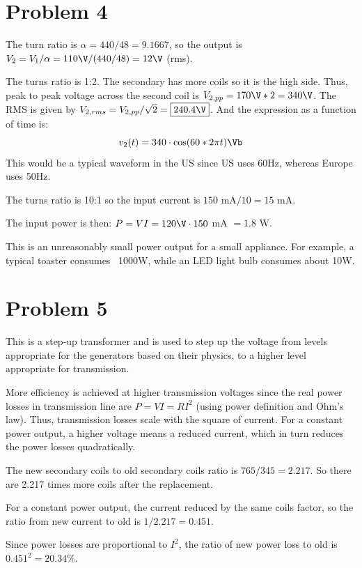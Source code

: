 \documentclass{homework}
\begin{document}
\section{Problem 4}
\begin{letterenum}
    \item The turn ratio is $\alpha = 440 / 48 = 9.1667$, so the output is
        $V_2 = V_1 / \alpha = 110 \V / (440 / 48) = 12 \V$ (rms).
    \item The turns ratio is 1:2. The secondary has more coils so it is
    the high side. Thus, peak to peak voltage across the 
    second coil is $V_{2,pp} = 170 \V * 2 = 340 \V$. The RMS is given by
    $V_{2,rms} = V_{2,pp}/\sqrt{2} = \boxed{240.4 \V}$. And the expression
    as a function of time is:
    \begin{equation*}
        v_2(t) = 340 \cdot \cos(60 * 2\pi t)  \Vb
    \end{equation*}
    This would be a typical waveform in the US since US uses 60Hz, whereas
    Europe uses 50Hz.

    \item The turns ratio is 10:1 so the input current is $150$ mA$/10 = 15$ mA.

    The input power is then: $P = VI = 120 \V \cdot 150$ mA $= 1.8$ W.

    This is an unreasonably small power output for a small appliance. For
    example, a typical toaster consumes ~1000W, while an LED light bulb 
    consumes about 10W.
\end{letterenum}

\section{Problem 5}

\begin{letterenum}
\item This is a step-up transformer and is used to step up the voltage
    from levels appropriate for the generators based on their physics,
    to a higher level appropriate for transmission.
\item More efficiency is achieved at higher transmission voltages since
    the real power losses in transmission line are $P = VI = RI^2$ (using
    power definition and Ohm's law). Thus, transmission losses scale with the
    square of current. For a constant power output, a higher voltage means
    a reduced current, which in turn reduces the power losses quadratically.
\item The new secondary coils to old secondary coils ratio is $765/345 = 2.217$.
    So there are 2.217 times more coils after the replacement.
\item For a constant power output, the current reduced by the same coils factor,
    so the ratio from new current to old is $1/2.217 = 0.451$.
\item Since power losses are proportional to $I^2$, the ratio of new power loss
    to old is $0.451^2 = 20.34\%$.
\end{letterenum}



\end{document}
